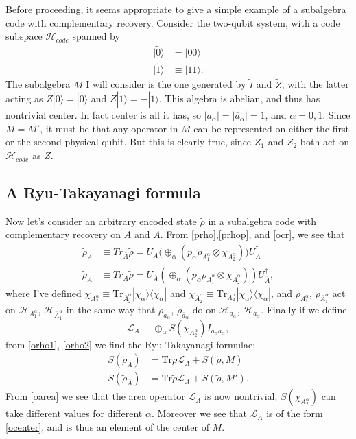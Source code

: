 \documentclass[12pt]{article}
\newcommand{\be}{\begin{equation}}
\newcommand{\ee}{\end{equation}}
\newcommand{\lan}{\langle}
\newcommand{\ran}{\rangle}
\newcommand{\Tr}{\mathrm{Tr}}
\newcommand{\wt}{\widetilde}
\newcommand{\Ll}{\mathcal{L}}
\newcommand{\Hh}{\mathcal{H}}
\newcommand{\Ab}{\ol{A}}
\newcommand{\ab}{\ol{a}}
\newcommand{\Hc}{\mathcal{H}_{code}}
\newcommand{\LA}{\Ll_A}
\newcommand{\ol}{\overline}
\begin{document}
Before proceeding, it seems appropriate to give a simple example of a subalgebra code with complementary recovery.  Consider the two-qubit system, with a code subspace $\Hc$ spanned by
\begin{align}\nonumber
|\wt{0}\ran&=|00\ran\\
|\wt{1}\ran&\equiv |11\ran.
\end{align}
The subalgebra $M$ I will consider is the one generated by $\wt{I}$ and $\wt{Z}$, with the latter acting as $\wt{Z}|\wt{0}\ran=|\wt{0}\ran$ and $\wt{Z}|\wt{1}\ran=-|\wt{1}\ran$.  This algebra is abelian, and thus has nontrivial center.  In fact center is all it has, so $|a_\alpha|=|\ab_\alpha|=1$, and $\alpha=0,1$.  Since $M=M'$, it must be that any operator in $M$ can be represented on either the first or the second physical qubit.  But this is clearly true, since $Z_1$ and $Z_2$ both act on $\Hc$ as $\wt{Z}$.


\subsection{A Ryu-Takayanagi formula}
Now let's consider an arbitrary encoded state $\wt{\rho}$ in a subalgebra code with complementary recovery on $A$ and $\Ab$.  From \eqref{prho},\eqref{prhop}, and \eqref{ocr}, we see that
\begin{align}\label{orho1}
\wt{\rho}_A&\equiv Tr_{\Ab}\wt{\rho}=U_A\Big(\oplus_\alpha \left(p_\alpha \rho_{A_1^\alpha}\otimes \chi_{A_2^\alpha}\right)\Big)U_A^\dagger\\\label{orho2}
\wt{\rho}_{\Ab}&\equiv Tr_{A}\wt{\rho}=U_{\Ab}\left(\oplus_\alpha \left(p_\alpha \rho_{\Ab_1^\alpha}\otimes \chi_{\Ab_2^\alpha}\right)\right)U_{\Ab}^\dagger,
\end{align}
where I've defined $\chi_{A_2^\alpha}\equiv \Tr_{\Ab_2^\alpha}|\chi_\alpha\ran\lan\chi_\alpha|$ and $\chi_{\Ab_2^\alpha}\equiv \Tr_{A_2^\alpha}|\chi_\alpha\ran\lan\chi_\alpha|$, and $\rho_{A_1^\alpha}$, $\rho_{\Ab_1^\alpha}$ act on $\Hh_{A_1^\alpha}$, $\Hh_{\Ab_1^\alpha}$ in the same way that $\wt{\rho}_{a_\alpha}$, $\wt{\rho}_{\ab_\alpha}$ do on $\Hh_{a_\alpha}$, $\Hh_{\ab_\alpha}$.  Finally if we define
\be\label{oarea}
\LA\equiv\oplus_\alpha S(\chi_{A_2^\alpha})I_{a_\alpha \ab_\alpha},
\ee
from \eqref{orho1}, \eqref{orho2} we find the Ryu-Takayanagi formulae:
\begin{align}\label{oflm1}
S(\wt{\rho}_A)&=\Tr \wt{\rho}\LA+S(\wt{\rho},M)\\\label{oflm2}
S(\wt{\rho}_{\Ab})&=\Tr \wt{\rho}\LA+S(\wt{\rho},M').
\end{align}
From \eqref{oarea} we see that the area operator $\LA$ is now nontrivial; $S(\chi_{A_2^\alpha})$ can take different values for different $\alpha$. Moreover we see that $\LA$ is of the form \eqref{ocenter}, and is thus an element of the center of $M$.
\end{document}
